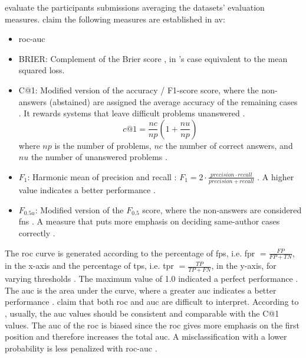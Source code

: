 \citet{ayele_overview_2024,bevendorff_overview_2024} evaluate the participants submissions averaging the datasets' evaluation measures.
\citet{ayele_overview_2024} claim the following measures are established in \ac{av}:
\begin{itemize}
    \item \ac{roc-auc} \cite{bevendorff_overview_2024,weerasinghe_feature_vector_difference_2021,kocher_unine_2015}
    
    \item BRIER: Complement of the Brier score \cite{bevendorff_overview_2024,weerasinghe_feature_vector_difference_2021}, in \citet{bevendorff_overview_2024}'s case equivalent to the mean squared loss.
    
    \item C@1: Modified version of the accuracy \cite{bevendorff_overview_2024}/ F1-score \cite{weerasinghe_feature_vector_difference_2021} score, 
    where the non-answers (abstained) \cite{llm_detection_av_2025} are assigned the average accuracy of the remaining cases \cite{bevendorff_overview_2024}. 
    It rewards systems that leave difficult problems unanswered \cite{weerasinghe_feature_vector_difference_2021}.
    $$c@1 = \frac{nc}{np}(1+\frac{nu}{np})$$ where $np$ is the number of problems, $nc$ the number of correct answers, 
    and $nu$ the number of unanswered problems \cite{kocher_unine_2015}.
    
    \item $F_1$: Harmonic mean of precision and recall \cite{bevendorff_overview_2024,weerasinghe_feature_vector_difference_2021}:
    $ F_1 = 2 \cdot \frac{precision \cdot recall}{precision + recall} $ \cite{neal_surveying_2018}.
    A higher value indicates a better performance \cite{neal_surveying_2018}.
    
    \item $F_{0.5u}$: Modified version of the $F_{0.5}$ score, where the non-answers are considered \acp{fn} \cite{bevendorff_overview_2024}. A measure that puts more emphasis on deciding same-author cases correctly \cite{weerasinghe_feature_vector_difference_2021}.
\end{itemize}

The \ac{roc} curve is generated according to the percentage of \acp{fp}, i.e. \ac{fpr} $= \frac{FP}{FP+TN}$, in the x-axis and 
the percentage of \acp{tp}, i.e. \ac{tpr} $=\frac{TP}{TP+FN}$, in the y-axis,
for varying thresholds \cite{kocher_unine_2015,neal_surveying_2018}.
The maximum value of 1.0 indicated a perfect performance \cite{kocher_unine_2015}.
The \ac{auc} is the area under the curve, where a greater \ac{auc} indicates a better performance \cite{neal_surveying_2018}.
\citet{kocher_unine_2015} claim that both \ac{roc} and \ac{auc} are difficult to interpret.
According to \citet{kocher_unine_2015}, usually, the \ac{auc} values should be consistent and comparable with the C@1 values.
The \ac{auc} of the \ac{roc} is biased since the \ac{roc} gives more emphasis 
on the first position and therefore increases the total \ac{auc}.
A misclassification with a lower probability is less penalized with \ac{roc-auc} \cite{kocher_unine_2015}.

